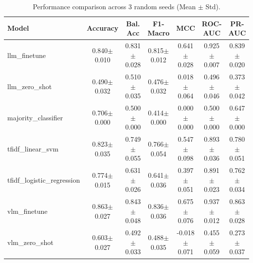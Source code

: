 \begin{table}[t]
\centering
\caption{Performance comparison across 3 random seeds (Mean $\pm$ Std).}
\label{tab:main_results}
\begin{tabular}{lcccccc}
\hline
\textbf{Model} & \textbf{Accuracy} & \textbf{Bal. Acc} & \textbf{F1-Macro} & \textbf{MCC} & \textbf{ROC-AUC} & \textbf{PR-AUC} \\
\hline
llm\_finetune & 0.840$\pm$0.010 & 0.831$\pm$0.028 & 0.815$\pm$0.012 & 0.641$\pm$0.028 & 0.925$\pm$0.007 & 0.839$\pm$0.020 \\
llm\_zero\_shot & 0.490$\pm$0.032 & 0.510$\pm$0.035 & 0.476$\pm$0.032 & 0.018$\pm$0.064 & 0.496$\pm$0.046 & 0.373$\pm$0.042 \\
majority\_classifier & 0.706$\pm$0.000 & 0.500$\pm$0.000 & 0.414$\pm$0.000 & 0.000$\pm$0.000 & 0.500$\pm$0.000 & 0.647$\pm$0.000 \\
tfidf\_linear\_svm & 0.823$\pm$0.035 & 0.749$\pm$0.055 & 0.766$\pm$0.054 & 0.547$\pm$0.098 & 0.893$\pm$0.036 & 0.780$\pm$0.051 \\
tfidf\_logistic\_regression & 0.774$\pm$0.015 & 0.631$\pm$0.026 & 0.641$\pm$0.036 & 0.397$\pm$0.051 & 0.891$\pm$0.023 & 0.762$\pm$0.034 \\
vlm\_finetune & 0.863$\pm$0.027 & 0.843$\pm$0.048 & 0.836$\pm$0.036 & 0.675$\pm$0.076 & 0.937$\pm$0.012 & 0.863$\pm$0.028 \\
vlm\_zero\_shot & 0.603$\pm$0.027 & 0.492$\pm$0.033 & 0.488$\pm$0.035 & -0.018$\pm$0.071 & 0.455$\pm$0.059 & 0.273$\pm$0.037 \\
\hline
\end{tabular}
\end{table}
